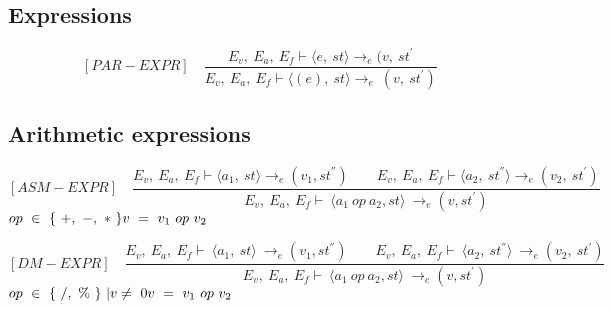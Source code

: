 \subsection{Expressions}
\[	
[PAR-EXPR] \quad	
\dfrac{E_v, \ E_a, \ E_f \vdash \langle e, \ st \rangle \rightarrow_e (v, \ st^{'}}{E_v, \ E_a, \ E_f \vdash \langle (e), \ st \rangle \rightarrow_e \ (v, \ st^{'})}	
\]

\subsection{Arithmetic expressions}
\[
[ASM-EXPR] \quad	
\dfrac{E_v, \ E_a, \ E_f \vdash \langle a_1, \ st \rangle \rightarrow_{e} (v_1, st^{''}) \qquad E_v, \ E_a, \ E_f \vdash \langle a_2, \ st^{''}\rangle \rightarrow_e (v_2, \ st^{'})}{E_v, \ E_a, \ E_f \vdash \ \langle a_1 \ op \ a_2, st \rangle \ \rightarrow_{e} (v, st^{'})}	
\]
\begin{math}		
	op \ \in \ \{ \ +, \ -, \ * \ \} \newline		
	v \ = \ v_1 \ op \ v_2		
\end{math}

\[
[DM-EXPR] \quad
\dfrac{E_v, \ E_a, \ E_f \vdash \ \langle a_1, \ st \rangle \ \rightarrow_{e} (v_1, st^{''}) \qquad E_v, \ E_a, \ E_f \vdash \ \langle a_2, \ st^{''} \rangle \ \rightarrow_e (v_2, \ st^{'})}{E_v, \ E_a, \ E_f \vdash \ \langle a_1 \ op \ a_2, st \rangle \ \rightarrow_{e} (v, st^{'})}	
\]
\begin{math}		
	op \ \in \ \{ \ /, \ \% \ \} \ | v \not= \ 0 \newline 		
	v \ = \ v_1 \ op \ v_2		
\end{math} 

